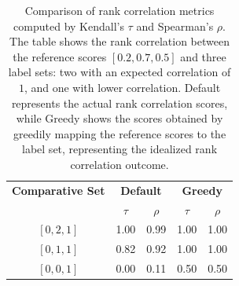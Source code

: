 \begin{table}[t]
  \centering
  \caption{Comparison of rank correlation metrics computed by Kendall's $\tau$ and Spearman's $\rho$. The table shows the rank correlation between the reference scores $[0.2,0.7,0.5]$ and three label sets: two with an expected correlation of $1$, and one with lower correlation. Default represents the actual rank correlation scores, while Greedy shows the scores obtained by greedily mapping the reference scores to the label set, representing the idealized rank correlation outcome.}
  \label{tab:rank-correlation}
  \begin{tabular}{ccccc}
      \toprule
      \textbf{Comparative Set} & \multicolumn{2}{c}{\textbf{Default}} & \multicolumn{2}{c}{\textbf{Greedy}} \\
      \cmidrule(lr){2-3} \cmidrule(lr){4-5}
                               & $\tau$ & $\rho$ & $\tau$ & $\rho$ \\
      \midrule
      
      $[0, 2, 1]$ & 1.00 & 0.99  & 1.00  & 1.00 \\
      $[0, 1, 1]$ & 0.82 & 0.92  & 1.00  & 1.00 \\
      $[0, 0, 1]$ & 0.00 & 0.11  & 0.50  & 0.50 \\
      \bottomrule
  \end{tabular}
\end{table}

